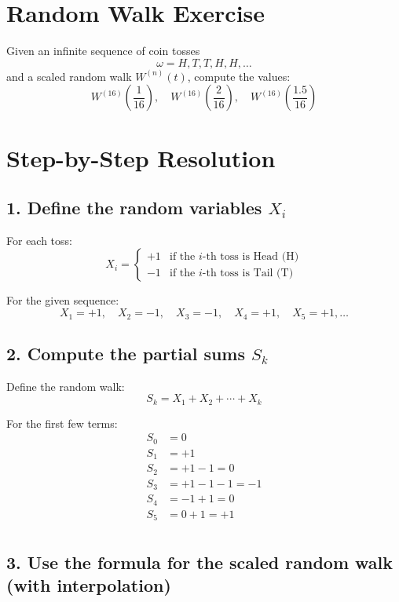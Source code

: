 

\section{Random Walk Exercise}

Given an infinite sequence of coin tosses
\[
\omega = H, T, T, H, H, \ldots
\]
and a scaled random walk \( W^{(n)}(t) \), compute the values:
\[
W^{(16)}\left(\frac{1}{16}\right), \quad W^{(16)}\left(\frac{2}{16}\right), \quad W^{(16)}\left(\frac{1.5}{16}\right)
\]

\section*{Step-by-Step Resolution}

\subsection*{1. Define the random variables \( X_i \)}

For each toss:
\[
X_i =
\begin{cases}
+1 & \text{if the $i$-th toss is Head (H)} \\
-1 & \text{if the $i$-th toss is Tail (T)}
\end{cases}
\]

For the given sequence:
\[
X_1 = +1, \quad X_2 = -1, \quad X_3 = -1, \quad X_4 = +1, \quad X_5 = +1, \ldots
\]

\subsection*{2. Compute the partial sums \( S_k \)}

Define the random walk:
\[
S_k = X_1 + X_2 + \cdots + X_k
\]

For the first few terms:
\[
\begin{aligned}
S_0 &= 0 \\
S_1 &= +1 \\
S_2 &= +1 -1 = 0 \\
S_3 &= +1 -1 -1 = -1 \\
S_4 &= -1 +1 = 0 \\
S_5 &= 0 +1 = +1 \\
\end{aligned}
\]

\subsection*{3. Use the formula for the scaled random walk (with interpolation)}

